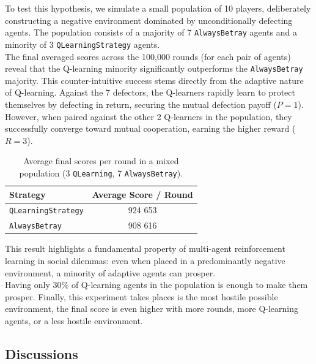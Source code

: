 \documentclass[11pt, a4paper]{article}
\begin{document}
To test this hypothesis, we simulate a small population of 10 players, deliberately constructing a negative environment dominated by unconditionally defecting agents. The population consists of a majority of 7 \texttt{AlwaysBetray} agents and a minority of 3 \texttt{QLearningStrategy} agents. \\

The final averaged scores across the 100,000 rounds (for each pair of agents) reveal that the Q-learning minority significantly outperforms the \texttt{AlwaysBetray} majority. This counter-intuitive success stems directly from the adaptive nature of Q-learning. Against the 7 defectors, the Q-learners rapidly learn to protect themselves by defecting in return, securing the mutual defection payoff ($P=1$). However, when paired against the other 2 Q-learners in the population, they successfully converge toward mutual cooperation, earning the higher reward ($R=3$). \\

\begin{table}[H]
  \centering
  \caption{Average final scores per round in a mixed population (3 \texttt{QLearning}, 7 \texttt{AlwaysBetray}).}
  \label{tab:population_scores}
  \begin{tabular}{lc}
    \toprule
    \textbf{Strategy} & \textbf{Average Score / Round} \\
    \midrule
    \texttt{QLearningStrategy} & 924 653  \\
    \texttt{AlwaysBetray}      & 908 616 \\
    \bottomrule
  \end{tabular}
\end{table}


This result highlights a fundamental property of multi-agent reinforcement learning in social dilemmas: even when placed in a predominantly negative environment, a minority of adaptive agents can prosper.\\

Having only 30\% of Q-learning agents in the population is enough to make them prosper. Finally, this experiment takes places is the most hostile possible environment, the final score is even higher with more rounds, more Q-learning agents, or a less hostile environment. \\
\newpage
\subsection{Discussions}
\label{sec:discussions}
\end{document}
